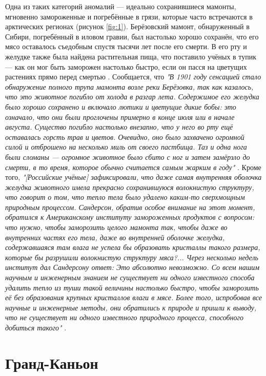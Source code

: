 \documentclass[10pt,twocolumn,letterpaper]{article}
\begin{document}
Одна из таких категорий аномалий — идеально сохранившиеся мамонты, мгновенно замороженные и погребённые в грязи, которые часто встречаются в арктических регионах (рисунок \ref{fig:1}). Берёзовский мамонт, обнаруженный в Сибири, погребённый в иловом гравии, был настолько хорошо сохранён, что его мясо оставалось съедобным спустя тысячи лет после его смерти. В его рту и желудке также была найдена растительная пища, что поставило учёных в тупик — как он мог быть заморожен настолько быстро, если он пасся на цветущих растениях прямо перед смертью \cite{17}. Сообщается, что \textit{"В 1901 году сенсацией стало обнаружение полного трупа мамонта возле реки Берёзовка, так как казалось, что это животное погибло от холода в разгар лета. Содержимое его желудка было хорошо сохранено и включало лютики и цветущие дикие бобы: это означало, что они были проглочены примерно в конце июля или в начале августа. Существо погибло настолько внезапно, что у него во рту ещё оставалась горсть трав и цветов. Очевидно, оно было захвачено огромной силой и отброшено на несколько миль от своего пастбища. Таз и одна нога были сломаны — огромное животное было сбито с ног и затем замёрзло до смерти, в то время, которое обычно считается самым жарким в году"} \cite{18}. Кроме того, \textit{"[Российские учёные] зафиксировали, что даже самая внутренняя оболочка желудка животного имела прекрасно сохранившуюся волокнистую структуру, что говорит о том, что тепло тела было удалено каким-то сверхмощным природным процессом. Сандерсон, обратив особое внимание на этот момент, обратился к Американскому институту замороженных продуктов с вопросом: что нужно, чтобы заморозить целого мамонта так, чтобы даже во внутренних частях его тела, даже во внутренней оболочке желудка, содержавшаяся там влага не успела бы образовать кристаллы такого размера, которые бы разрушили волокнистую структуру мяса?... Через несколько недель институт дал Сандерсону ответ: Это абсолютно невозможно. Со всем нашим научным и инженерным знанием не существует ни одного известного способа удалить тепло из туши такой величины настолько быстро, чтобы заморозить её без образования крупных кристаллов влаги в мясе. Более того, испробовав все научные и инженерные методы, они обратились к природе и пришли к выводу, что не существует ни одного известного природного процесса, способного добиться такого"} \cite{19}.

\section{Гранд-Каньон}
\end{document}
